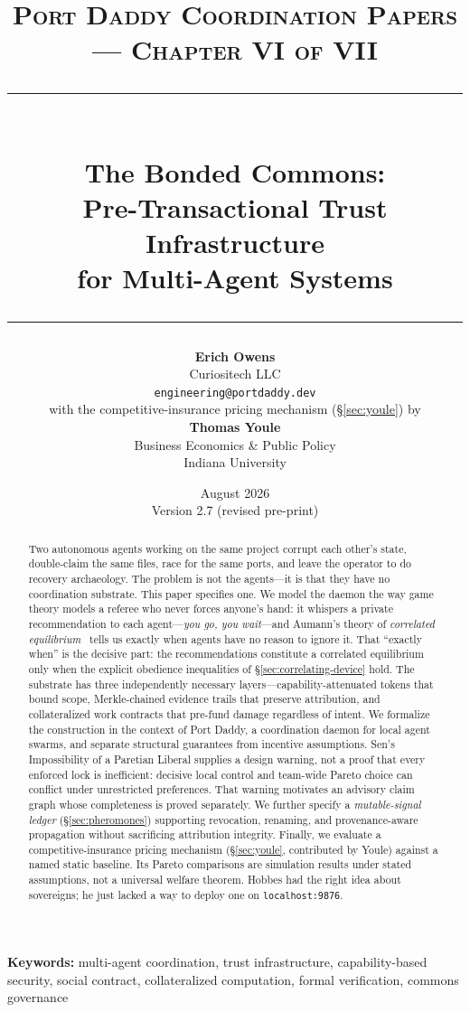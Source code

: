 \documentclass[11pt,a4paper]{article}
\title{
  \vspace{-1cm}
  {\Large\textsc{Port Daddy Coordination Papers --- Chapter VI of VII}}\\[0.5cm]
  \rule{\textwidth}{0.5pt}\\[0.3cm]
  {\LARGE\textbf{The Bonded Commons:}}\\[0.2cm]
  {\Large Pre-Transactional Trust Infrastructure\\for Multi-Agent Systems}\\[0.3cm]
  \rule{\textwidth}{0.5pt}
}
\author{
  \textbf{Erich Owens}\\[0.2cm]
  Curiositech LLC\\[0.2cm]
  \texttt{engineering@portdaddy.dev}\\[0.4cm]
  with the competitive-insurance pricing mechanism (\S\ref{sec:youle}) by\\[0.1cm]
  \textbf{Thomas Youle}\\[0.1cm]
  Business Economics \& Public Policy\\[0.1cm]
  Indiana University
}
\date{August 2026\\Version 2.7 (revised pre-print)}
\theoremstyle{definition}
\theoremstyle{remark}
\begin{document}
\setlength{\emergencystretch}{2em}

\maketitle
\thispagestyle{empty}

\vspace{1cm}

\begin{abstract}\noindent
Two autonomous agents working on the same project corrupt each other's state, double-claim the same files, race for the same ports, and leave the operator to do recovery archaeology. The problem is not the agents---it is that they have no coordination substrate. This paper specifies one. We model the daemon the way game theory models a referee who never forces anyone's hand: it whispers a private recommendation to each agent---\emph{you go, you wait}---and Aumann's theory of \emph{correlated equilibrium}~\cite{aumann1974subjectivity} tells us exactly when agents have no reason to ignore it. That ``exactly when'' is the decisive part: the recommendations constitute a correlated equilibrium only when the explicit obedience inequalities of \S\ref{sec:correlating-device} hold. The substrate has three independently necessary layers---capability-attenuated tokens that bound scope, Merkle-chained evidence trails that preserve attribution, and collateralized work contracts that pre-fund damage regardless of intent. We formalize the construction in the context of Port Daddy, a coordination daemon for local agent swarms, and separate structural guarantees from incentive assumptions. Sen's Impossibility of a Paretian Liberal supplies a design warning, not a proof that every enforced lock is inefficient: decisive local control and team-wide Pareto choice can conflict under unrestricted preferences. That warning motivates an advisory claim graph whose completeness is proved separately. We further specify a \emph{mutable-signal ledger} (\S\ref{sec:pheromones}) supporting revocation, renaming, and provenance-aware propagation without sacrificing attribution integrity. Finally, we evaluate a competitive-insurance pricing mechanism (\S\ref{sec:youle}, contributed by Youle) against a named static baseline. Its Pareto comparisons are simulation results under stated assumptions, not a universal welfare theorem. Hobbes had the right idea about sovereigns; he just lacked a way to deploy one on \texttt{localhost:9876}.
\end{abstract}

\vspace{0.5cm}
\noindent\textbf{Keywords:} multi-agent coordination, trust infrastructure, capability-based security, social contract, collateralized computation, formal verification, commons governance
\end{document}
